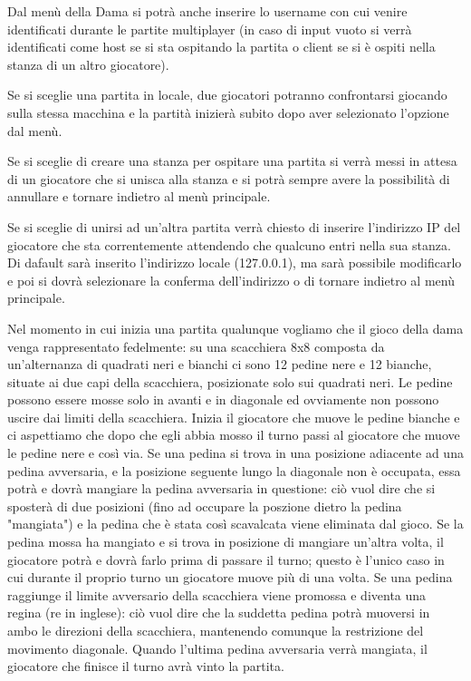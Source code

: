 \documentclass[12pt]{article}
\begin{document}
Dal menù della Dama si potrà anche inserire lo username con cui venire identificati durante le partite multiplayer (in caso di input vuoto si verrà identificati come host se si sta ospitando la partita o client se si è ospiti nella stanza di un altro giocatore).

Se si sceglie una partita in locale, due giocatori potranno confrontarsi giocando sulla stessa macchina e la partità inizierà subito dopo aver selezionato l'opzione dal menù.

Se si sceglie di creare una stanza per ospitare una partita si verrà messi in attesa di un giocatore che si unisca alla stanza e si potrà sempre avere la possibilità di annullare e tornare indietro al menù principale.

Se si sceglie di unirsi ad un'altra partita verrà chiesto di inserire l'indirizzo IP del giocatore che sta correntemente attendendo che qualcuno entri nella sua stanza. Di dafault sarà inserito l'indirizzo locale (127.0.0.1), ma sarà possibile modificarlo e poi si dovrà selezionare la conferma dell'indirizzo o di tornare indietro al menù principale.

Nel momento in cui inizia una partita qualunque vogliamo che il gioco della dama venga rappresentato fedelmente: su una scacchiera 8x8 composta da un'alternanza di quadrati neri e bianchi ci sono 12 pedine nere e 12 bianche, situate ai due capi della scacchiera, posizionate solo sui quadrati neri. Le pedine possono essere mosse solo in avanti e in diagonale ed ovviamente non possono uscire dai limiti della scacchiera. Inizia il giocatore che muove le pedine bianche e ci aspettiamo che dopo che egli abbia mosso il turno passi al giocatore che muove le pedine nere e così via. Se una pedina si trova in una posizione adiacente ad una pedina avversaria, e la posizione seguente lungo la diagonale non è occupata, essa potrà e dovrà mangiare la pedina avversaria in questione: ciò vuol dire che si sposterà di due posizioni (fino ad occupare la poszione dietro la pedina "mangiata") e la pedina che è stata così scavalcata viene eliminata dal gioco. Se la pedina mossa ha mangiato e si trova in posizione di mangiare un'altra volta, il giocatore potrà e dovrà farlo prima di passare il turno; questo è l'unico caso in cui durante il proprio turno un giocatore muove più di una volta. Se una pedina raggiunge il limite avversario della scacchiera viene promossa e diventa una regina (re in inglese): ciò vuol dire che la suddetta pedina potrà muoversi in ambo le direzioni della scacchiera, mantenendo comunque la restrizione del movimento diagonale. Quando l'ultima pedina avversaria verrà mangiata, il giocatore che finisce il turno avrà vinto la partita.
\end{document}
